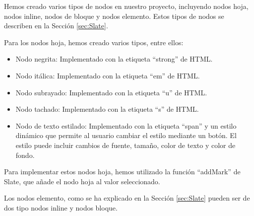 Hemos creado varios tipos de nodos en nuestro proyecto, incluyendo nodos hoja, nodos inline, nodos de bloque y nodos elemento. Estos tipos de nodos se describen en la Sección \ref{sec:Slate}.

Para los nodos hoja, hemos creado varios tipos, entre ellos:

\begin{itemize}
  \item Nodo negrita: Implementado con la etiqueta ``strong'' de HTML.
  \item Nodo itálica: Implementado con la etiqueta ``em'' de HTML.
  \item Nodo subrayado: Implementado con la etiqueta ``u'' de HTML.
  \item Nodo tachado: Implementado con la etiqueta ``s'' de HTML.
  \item Nodo de texto estilado: Implementado con la etiqueta ``span'' y un estilo dinámico que permite al usuario cambiar el estilo mediante un botón. El estilo puede incluir cambios de fuente, tamaño, color de texto y color de fondo.
\end{itemize}

Para implementar estos nodos hoja, hemos utilizado la función ``addMark'' de Slate, que añade el nodo hoja al valor seleccionado.

Los nodos elemento, como se ha explicado en la Sección \ref{sec:Slate} pueden ser de dos tipo nodos inline y nodos bloque. 

